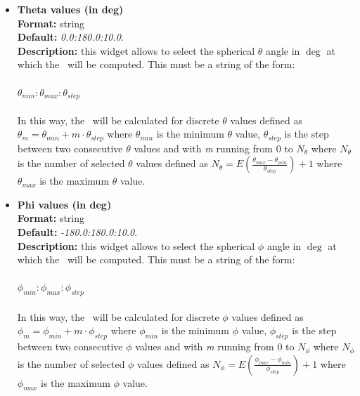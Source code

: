 \documentclass[a4paper,11pt]{report}
\newcommand{\nm}{\textit{nm}}
\begin{document}
\begin{itemize}
For example,
\begin{itemize}
\item \textit{0:10:1} will compute \PDF\ for \textit{r = 0, 1, 2, 3, 4, 5, 6, 7, 8, 9, 10} \nm .
\item \textit{3:7:1.2} will compute \PDF\ for \textit{r = 3, 4.2, 5.4, 6.6} \nm .
\end{itemize}
\newpage
\item \textbf{Theta values (in deg)}\\
\textbf{Format:} string\\
\textbf{Default:} \textit{0.0:180.0:10.0}.\\
\textbf{Description:} this widget allows to select the spherical $\theta$ angle in $\deg$ at which the \SD\ will be computed. 
This must be a string of the form:
\\\\
$\theta_{min}:\theta_{max}:\theta_{step}$
\\\\
In this way, the \SD\ will be calculated for discrete $\theta$ values defined as 
$\theta_m = \theta_{min} + m \cdot \theta_{step}$ where $\theta_{min}$ is the minimum $\theta$ value, $\theta_{step}$ is 
the step between two consecutive $\theta$ values and with \textit{m} running from 0 to $N_{\theta}$ 
where $N_{\theta}$ is the number of selected $\theta$ values defined as 
$N_{\theta}= E(\frac{\theta_{max} - \theta_{min}}{\theta_{step}}) + 1$ where $\theta_{max}$ is the 
maximum $\theta$ value.

\item \textbf{Phi values (in deg)}\\
\textbf{Format:} string\\
\textbf{Default:} \textit{-180.0:180.0:10.0}.\\
\textbf{Description:} this widget allows to select the spherical $\phi$ angle in $\deg$ at which the \SD\ will be computed. 
This must be a string of the form:
\\\\
$\phi_{min}:\phi_{max}:\phi_{step}$
\\\\
In this way, the \SD\ will be calculated for discrete $\phi$ values defined as 
$\phi_m = \phi_{min} + m \cdot \phi_{step}$ where $\phi_{min}$ is the minimum $\phi$ value, $\phi_{step}$ is 
the step between two consecutive $\phi$ values and with \textit{m} running from 0 to $N_{\phi}$ 
where $N_{\phi}$ is the number of selected $\phi$ values defined as 
$N_{\phi}= E(\frac{\phi_{max} - \phi_{min}}{\phi_{step}}) + 1$ where $\phi_{max}$ is the 
maximum $\phi$ value.


\end{itemize}
\end{document}
